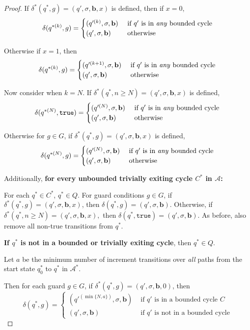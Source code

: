 \documentclass[12pt]{article}
\theoremstyle{definition}
\begin{document}
\begin{proof}
If $\delta^*(q^*, g) = (q', \sigma, \mathbf{b}, x)$ is defined, then
if $x = 0$,  
\[\delta(q^{*(k)}, g) = \begin{cases}
	(q'^{(k)}, \sigma, \mathbf{b}) &\text{ if } q' \text{ is in \textit{any} bounded cycle}\\
	(q', \sigma, \mathbf{b}) & \text{ otherwise}
\end{cases}\]


Otherwise if $x=1$, then 
\[\delta(q^{*(k)}, g) = \begin{cases}
	(q'^{(k+1)}, \sigma, \mathbf{b}) &\text{ if } q' \text{ is in \textit{any} bounded cycle}\\
	(q', \sigma, \mathbf{b}) &  \text{ otherwise}
\end{cases}\]

Now consider when $k=N$. If $\delta^*(q^*, n\geq N) = (q', \sigma, \mathbf{b}, x)$ is defined, 
\[\delta(q^{*(N)}, \texttt{true}) = \begin{cases}
	(q'^{(N)}, \sigma, \mathbf{b}) &\text{ if } q' \text{ is in \textit{any} bounded cycle}\\
	(q', \sigma, \mathbf{b}) & \text{ otherwise}
\end{cases}\]

Otherwise for $g\in G$, if $\delta^*(q^*, g) = (q', \sigma, \mathbf{b}, x)$ is defined,
\[\delta(q^{*(N)}, g) = \begin{cases}
	(q'^{(N)}, \sigma, \mathbf{b}) &\text{ if } q' \text{ is in \textit{any} bounded cycle}\\
	(q', \sigma, \mathbf{b}) & \text{ otherwise}
\end{cases}\]

Additionally, \textbf{for every unbounded trivially exiting cycle $C^*$ in $\mathcal{A}$:}

For each $q^* \in C^*$, $q^*\in Q$. 
For guard conditions $g\in G$, if $\delta^*(q^*, g) = (q', \sigma, \mathbf{b}, x)$, then $\delta(q^*, g) = (q', \sigma, \mathbf{b})$. Otherwise, if $\delta^*(q^*, n\geq N) = (q', \sigma, \mathbf{b}, x),$ then $\delta(q^*, \texttt{true}) = (q', \sigma, \mathbf{b})$. As before, also remove all non-true transitions from $q^*$.

\textbf{If $q^*$ is not in a bounded or trivially exiting cycle}, then $q^* \in Q$. 

Let $a$ be the minimum number of increment transitions over \textit{all} paths from the start state $q^*_0$ to $q^*$ in $\mathcal{A}^*$.

Then for each guard $g\in G$, if $\delta^*(q^*, g) = (q', \sigma, \mathbf{b}, 0)$, then 
\[\delta(q^*, g) = \begin{cases}
(q'^{(\min\{N, a\})}, \sigma, \mathbf{b}) & \text{ if }q' \text{ is in a  bounded cycle } C \\
(q', \sigma, \mathbf{b}) & \text{ if }q' \text{ is not in a bounded cycle}
\end{cases}\]


\end{proof}
\end{document}
